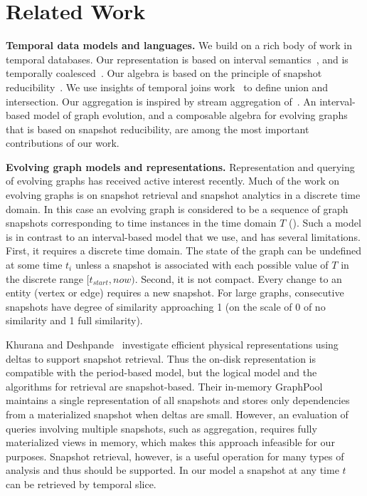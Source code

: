 \section{Related Work}
\label{sec:related}

{\bf Temporal data models and languages.} We build on a rich body of
work in temporal databases.  Our \tg representation is based on
interval semantics~\cite{DBLP:reference/db/JensenS09k}, and is
temporally coalesced~\cite{DBLP:conf/vldb/BohlenSS96}.  Our algebra is
based on the principle of snapshot
reducibility~\cite{DBLP:reference/db/Bohlen092}.  We use insights of
temporal joins work~\cite{Gao2005} to define \tg union and
intersection.  Our \tg aggregation is inspired by stream aggregation
of~\cite{Li2005}.  An interval-based model of graph evolution, and a
composable algebra for evolving graphs that is based on snapshot
reducibility, are among the most important contributions of our work.

{\bf Evolving graph models and representations.}  Representation and
querying of evolving graphs has received active interest
recently. Much of the work on evolving graphs is on snapshot retrieval
and snapshot analytics in a discrete time domain.  In this case an
evolving graph is considered to be a sequence of graph snapshots
corresponding to time instances in the time domain $T$
(\cite{Khurana2013,DBLP:journals/tos/MiaoHLWYZPCC15,Ren2011}).  Such a
model is in contrast to an interval-based model that we use, and has
several limitations.  First, it requires a discrete time domain. The
state of the graph can be undefined at some time $t_i$ unless a
snapshot is associated with each possible value of $T$ in the discrete
range $[t_{start}, now)$.  Second, it is not compact.  Every change to
  an entity (vertex or edge) requires a new snapshot.  For large
  graphs, consecutive snapshots have degree of similarity approaching
  1 (on the scale of 0 of no similarity and 1 full similarity).

Khurana and Deshpande~\cite{Khurana2013} investigate efficient
physical representations using deltas to support snapshot retrieval.
Thus the on-disk representation is compatible with the period-based
model, but the logical model and the algorithms for retrieval are
snapshot-based.  Their in-memory GraphPool maintains a single
representation of all snapshots and stores only dependencies from a
materialized snapshot when deltas are small.  However, an evaluation
of queries involving multiple snapshots, such as aggregation, requires
fully materialized views in memory, which makes this approach
infeasible for our purposes.  Snapshot retrieval, however, is a useful
operation for many types of analysis and thus should be supported.  In
our model a snapshot at any time $t$ can be retrieved by temporal
slice.

